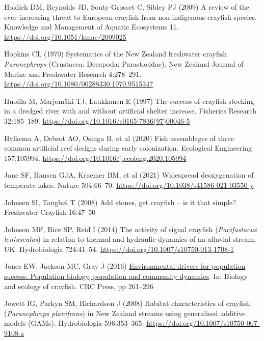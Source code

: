 \documentclass[
  12pt,
  a4paper,
]{scrbook}
\newlength{\cslhangindent}
\newenvironment{CSLReferences}[2] %
 {\begin{list}{}{%
  \setlength{\itemindent}{0pt}
  \setlength{\leftmargin}{0pt}
  \setlength{\parsep}{0pt}
  \ifodd #1
   \setlength{\leftmargin}{\cslhangindent}
   \setlength{\itemindent}{-1\cslhangindent}
  \fi
  \setlength{\itemsep}{#2\baselineskip}}}
 {\end{list}}
\begin{document}
\begin{CSLReferences}{1}{1}
Holdich DM, Reynolds JD, Souty-Grosset C, Sibley PJ (2009) A review of
the ever increasing threat to {European} crayfish from non-indigenous
crayfish species. Knowledge and Management of Aquatic Ecosystems 11.
\url{https://doi.org/10.1051/kmae/2009025}

Hopkins CL (1970) Systematics of the {New Zealand} freshwater crayfish
{\emph{Paranephrops}} ({Crustacea}: {Decapoda}: {Parastacidae}). New
Zealand Journal of Marine and Freshwater Research 4:278--291.
\url{https://doi.org/10.1080/00288330.1970.9515347}

Huolila M, Marjomäki TJ, Laukkanen E (1997) The success of crayfish
stocking in a dredged river with and without artificial shelter
increase. Fisheries Research 32:185--189.
\url{https://doi.org/10.1016/s0165-7836(97)00046-5}

Hylkema A, Debrot AO, Osinga R, et al (2020) Fish assemblages of three
common artificial reef designs during early colonization. Ecological
Engineering 157:105994.
\url{https://doi.org/10.1016/j.ecoleng.2020.105994}

{Jane SF, Hansen GJA, Kraemer BM, et al} (2021) Widespread deoxygenation
of temperate lakes. Nature 594:66--70.
\url{https://doi.org/10.1038/s41586-021-03550-y}

Johnsen SI, Taugbøl T (2008) Add stones, get crayfish -- is it that
simple? Freshwater Crayfish 16:47--50

Johnson MF, Rice SP, Reid I (2014) The activity of signal crayfish
({\emph{Pacifastacus leniusculus}}) in relation to thermal and hydraulic
dynamics of an alluvial stream, {UK}. Hydrobiologia 724:41--54.
\url{https://doi.org/10.1007/s10750-013-1708-1}

Jones EW, Jackson MC, Gray J (2016)
\href{https://doi.org/10.1201/b20073-10}{Environmental drivers for
population success: Population biology, population and community
dynamics}. In: Biology and ecology of crayfish. CRC Press, pp 261--296

Jowett IG, Parkyn SM, Richardson J (2008) Habitat characteristics of
crayfish ({\emph{Paranephrops planifrons}}) in {New Zealand} streams
using generalised additive models ({GAMs}). Hydrobiologia 596:353--365.
\url{https://doi.org/10.1007/s10750-007-9108-z}


\end{CSLReferences}
\end{document}
